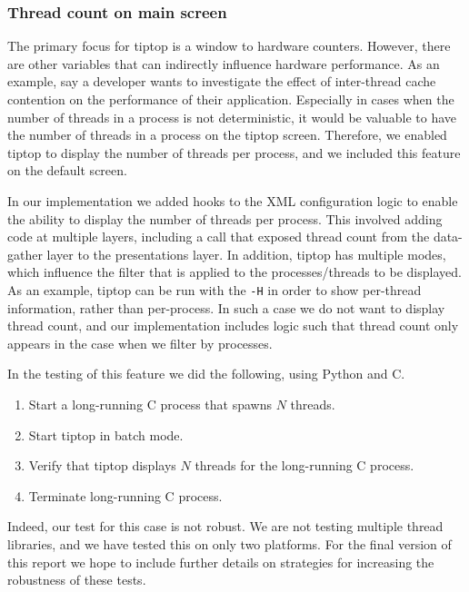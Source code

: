 \subsubsection{Thread count on main screen}
The primary focus for tiptop is a window to hardware counters.
However, there are other variables that can indirectly influence hardware performance.
As an example, say a developer wants to investigate the effect of inter-thread cache contention on the performance of their application.
Especially in cases when the number of threads in a process is not deterministic, it would be valuable to have the number of threads in a process on the tiptop screen. 
Therefore, we enabled tiptop to display the number of threads per process, and we included this feature on the default screen.

In our implementation we added hooks to the XML configuration logic to enable the ability to display the number of threads per process.
This involved adding code at multiple layers, including a call that exposed thread count from the data-gather layer to the presentations layer.
In addition, tiptop has multiple modes, which influence the filter that is applied to the processes/threads to be displayed.
As an example, tiptop can be run with the \texttt{-H} in order to show per-thread information, rather than per-process.
In such a case we do not want to display thread count, and our implementation includes logic such that thread count only appears in the case when we filter by processes.

In the testing of this feature we did the following, using Python and C.
\begin{enumerate}
\item Start a long-running C process that spawns $N$ threads.
\item Start tiptop in batch mode.
\item Verify that tiptop displays $N$ threads for the long-running C process.
\item Terminate long-running C process.
\end{enumerate}

Indeed, our test for this case is not robust. We are not testing multiple thread libraries, and we have tested this on only two platforms.
For the final version of this report we hope to include further details on strategies for increasing the robustness of these tests.

